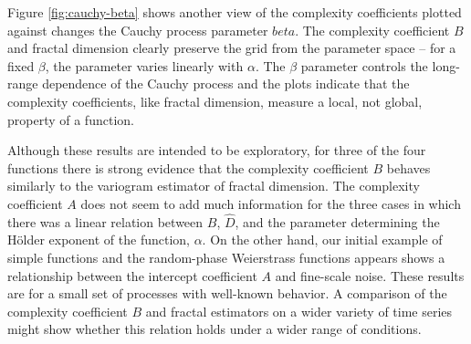 Figure \ref{fig:cauchy-beta} shows another view of 
the complexity coefficients plotted against 
changes the Cauchy process parameter $beta$. The complexity 
coefficient $B$ and fractal dimension clearly preserve 
the grid from the parameter space -- for a fixed 
$\beta$, the parameter varies linearly with $\alpha$. The 
$\beta$ parameter controls the long-range dependence of 
the Cauchy process and the plots indicate that 
the complexity coefficients, like fractal dimension,
measure a local, not global, property of a function.


Although these results are intended to be exploratory, for 
three of the four functions there is strong evidence that
the complexity coefficient $B$ behaves similarly to the 
variogram estimator of fractal dimension. The complexity 
coefficient $A$ does not seem to add much information 
for the three cases in which there was a linear relation between 
 $B$, $\hat D$, and the parameter determining the 
 H\"older exponent of the function, $\alpha$. 
 On the other hand, our initial example of simple functions and the random-phase Weierstrass functions appears shows a relationship between the intercept 
coefficient $A$ and fine-scale noise. These results are for a small set of processes with well-known behavior. A comparison of the complexity coefficient $B$ and fractal estimators on a wider variety of time series might show whether this relation holds under a wider range of conditions.





















